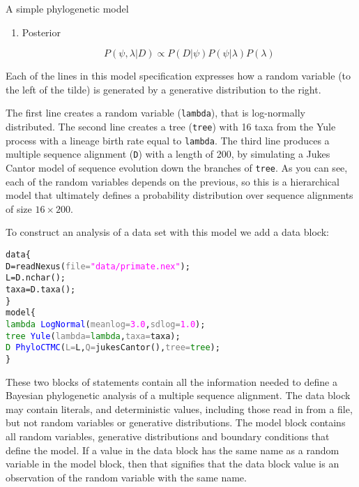 \documentclass[10pt,letterpaper,table]{article}
\begin{document}
\begin{mybox}[label=box1, float=htpb!]{A simple phylogenetic model}
\begin{enumerate}
\item Posterior

$$P(\psi, \lambda | D) \propto P(D | \psi) P(\psi | \lambda) P(\lambda) $$

\end{enumerate}

\end{mybox}

Each of the lines in this model specification expresses how a random
variable (to the left of the tilde) is generated by a generative
distribution to the right.

The first line creates a random variable (\texttt{lambda}), that is
log-normally distributed.
The second line creates a tree (\texttt{tree}) with 16 taxa from the
Yule process with a lineage birth rate equal to \texttt{lambda}.
The third line produces a multiple sequence alignment (\texttt{D})
with a length of 200, by simulating a Jukes Cantor model of sequence
evolution down the branches of  \texttt{tree}.
As you can see, each of the random variables depends on the previous,
so this is a hierarchical model that ultimately defines a probability
distribution over sequence alignments of size $16 \times 200$.

To construct an analysis of a data set with this model we add a data block:

{\small
\begin{alltt}
data \{
  D = \textcolor{magenta!80!black}{readNexus}(\textcolor{gray}{file=}\textcolor{magenta}{"data/primate.nex"});
  L = D.\textcolor{magenta!80!black}{nchar}();
  taxa = D.\textcolor{magenta!80!black}{taxa}();
\}
model \{
  \textcolor{green}{lambda} ~ \textcolor{blue}{LogNormal}(\textcolor{gray}{meanlog=}\textcolor{magenta}{3.0}, \textcolor{gray}{sdlog=}\textcolor{magenta}{1.0});
  \textcolor{green}{tree} ~ \textcolor{blue}{Yule}(\textcolor{gray}{lambda=}\textcolor{green}{lambda}, \textcolor{gray}{taxa=}taxa);
  \textcolor{green}{D} ~ \textcolor{blue}{PhyloCTMC}(\textcolor{gray}{L=}L, \textcolor{gray}{Q=}\textcolor{magenta!80!black}{jukesCantor}(), \textcolor{gray}{tree=}\textcolor{green}{tree});
\}
\end{alltt}}

These two blocks of statements contain all the information needed to define
a Bayesian phylogenetic analysis of a multiple sequence alignment.
The data block may contain literals, and deterministic values, including those read in from a file, but not random variables or generative distributions.
The model block contains all random variables, generative distributions and boundary conditions that define the model.
If a value in the data block has the same name as a random variable in the model block, then that signifies that the data block value is an observation of the random variable with the same name.
\end{document}
